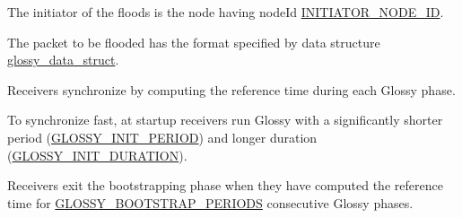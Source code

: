 The initiator of the floods is the node having nodeId \hyperlink{group__glossy-test-settings_ga2e373237aef3ee2b0fdb15cd0b8c5390}{INITIATOR\_\-NODE\_\-ID}.

The packet to be flooded has the format specified by data structure \hyperlink{structglossy__data__struct}{glossy\_\-data\_\-struct}.

Receivers synchronize by computing the reference time during each Glossy phase.

To synchronize fast, at startup receivers run Glossy with a significantly shorter period (\hyperlink{group__glossy-test-settings_ga21f18e3204161cd2b12f9979a28376f2}{GLOSSY\_\-INIT\_\-PERIOD}) and longer duration (\hyperlink{group__glossy-test-settings_gaa096b07a5e769ee16ce1e872b8fa9e96}{GLOSSY\_\-INIT\_\-DURATION}).

Receivers exit the bootstrapping phase when they have computed the reference time for \hyperlink{group__glossy-test-settings_ga8c2dcd42a2c913f0f80525a7c2eac3f1}{GLOSSY\_\-BOOTSTRAP\_\-PERIODS} consecutive Glossy phases. 